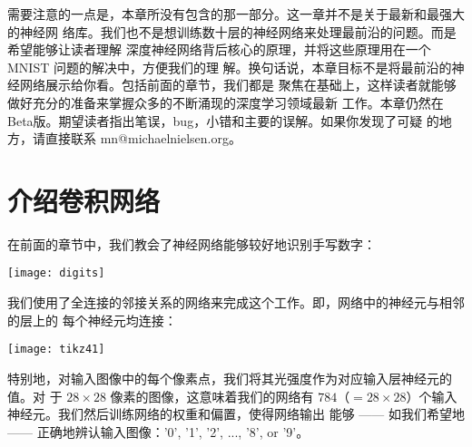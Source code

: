 需要注意的一点是，本章所没有包含的那一部分。这一章并不是关于最新和最强大的神经网
络库。我们也不是想训练数十层的神经网络来处理最前沿的问题。而是希望能够让读者理解
深度神经网络背后核心的原理，并将这些原理用在一个 MNIST 问题的解决中，方便我们的理
解。换句话说，本章目标不是将最前沿的神经网络展示给你看。包括前面的章节，我们都是
聚焦在基础上，这样读者就能够做好充分的准备来掌握众多的不断涌现的深度学习领域最新
工作。本章仍然在Beta版。期望读者指出笔误，bug，小错和主要的误解。如果你发现了可疑
的地方，请直接联系 mn@michaelnielsen.org。

\section{介绍卷积网络}
\label{sec:convolutional_networks}

在前面的章节中，我们教会了神经网络能够较好地识别手写数字：
\begin{center}
  \texttt{[image: digits]}
\end{center}

我们使用了全连接的邻接关系的网络来完成这个工作。即，网络中的神经元与相邻的层上的
每个神经元均连接：
\begin{center}
  \texttt{[image: tikz41]}
\end{center}

特别地，对输入图像中的每个像素点，我们将其光强度作为对应输入层神经元的值。对
于 $28 \times 28$ 像素的图像，这意味着我们的网络有
$784$（$= 28 \times 28$）个输入神经元。我们然后训练网络的权重和偏置，使得网络输出
能够 —— 如我们希望地 —— 正确地辨认输入图像：'0', '1', '2', ..., '8', or '9'。

